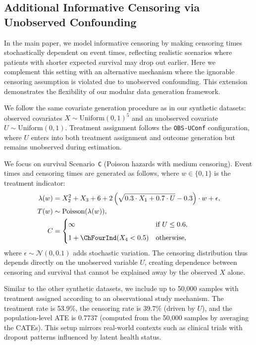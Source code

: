 \subsection{Additional Informative Censoring via Unobserved Confounding}
\label{ch04:app:informative-censoring-uconf}
In the main paper, we model informative censoring by making censoring times stochastically dependent on event times, reflecting realistic scenarios where patients with shorter expected survival may drop out earlier. 
Here we complement this setting with an alternative mechanism where the ignorable censoring assumption is violated due to unobserved confounding. 
This extension demonstrates the flexibility of our modular data generation framework.

We follow the same covariate generation procedure as in our synthetic datasets: observed covariates $X \sim \text{Uniform}(0,1)^5$ and an unobserved covariate $U \sim \text{Uniform}(0,1)$. 
Treatment assignment follows the \texttt{OBS-UConf} configuration, where $U$ enters into both treatment assignment and outcome generation but remains unobserved during estimation. 

We focus on survival Scenario~\texttt{C} (Poisson hazards with medium censoring).
Event times and censoring times are generated as follows, where $w \in \{0,1\}$ is the treatment indicator:
\begin{align}
    \lambda(w) &= X_2^2 + X_3 + 6 + 2\left(\sqrt{0.3 \cdot X_1 + 0.7 \cdot U} - 0.3\right) \cdot w + \epsilon, \\
    T(w) &\sim \text{Poisson}(\lambda(w)), \\
    C &= 
    \begin{cases} 
      \infty & \text{if } U \leq 0.6, \\[0.5em]
      1 + \ChFourInd(X_{4} < 0.5) & \text{otherwise},
    \end{cases}
\end{align}
where $\epsilon \sim \mathcal{N}(0,0.1)$ adds stochastic variation. 
The censoring distribution thus depends directly on the unobserved variable $U$, creating dependence between censoring and survival that cannot be explained away by the observed $X$ alone. 

Similar to the other synthetic datasets, we include up to 50{,}000 samples with treatment assigned according to an observational study mechanism. 
The treatment rate is 53.9\%, the censoring rate is 39.7\% (driven by $U$), and the population-level ATE is 0.7737 (computed from the 50,000 samples by averaging the CATEs). 
This setup mirrors real-world contexts such as clinical trials with dropout patterns influenced by latent health status.

